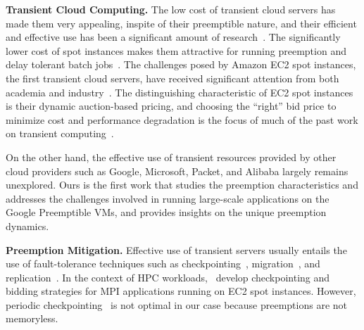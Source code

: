 \noindent \textbf{Transient Cloud Computing.}
The low cost of transient cloud servers has made them very appealing, inspite of their preemptible nature, and their efficient and effective use has been a significant amount of research~\cite{prateek-thesis}. 
The significantly lower cost of spot instances makes them attractive for running preemption and delay tolerant batch jobs~\cite{spoton, jain14demand, yi2010reducing, conductor, liu-spot, spot-run, dubois2016optispot, varshney_autobot_2019}.
The challenges posed by Amazon EC2 spot instances, the first transient cloud servers, have received significant attention from both academia  and industry~\cite{spotinst}. 
The distinguishing characteristic of EC2 spot instances is their dynamic auction-based pricing, and choosing the ``right'' bid price to minimize cost and performance degradation is the focus of much of the past work on transient computing~\cite{bidding4,mihailescu2012impact,bidding7,bidding1,bidding8,bidding3,bidding6,bid-cloud,bidding5,wolski_probabilistic_2017, guo_bidding_2015}.



On the other hand, the effective use of transient resources provided by other cloud providers such as Google, Microsoft, Packet, and Alibaba largely remains unexplored. 
Ours is the first work that studies the preemption characteristics and addresses the challenges involved in running large-scale applications on the Google Preemptible VMs, and provides insights on the unique preemption dynamics. %

\noindent \textbf{Preemption Mitigation.}
Effective use of transient servers usually entails the use of fault-tolerance techniques such as checkpointing~\cite{flint}, migration~\cite{spotcheck}, and replication~\cite{spoton}. 
In the context of HPC workloads,~\cite{marathe2014exploiting,gong_monetary_2015,xiang_spotmpi:_2011} develop checkpointing and bidding strategies for MPI applications running on EC2 spot instances.
However, periodic checkpointing~\cite{dongarra_fault_nodate} is not optimal in our case because preemptions are not memoryless. 

